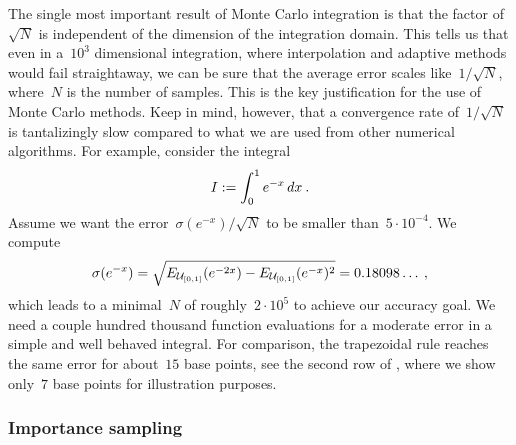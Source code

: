 The single most important result of Monte Carlo integration is that the factor
of~$\sqrt{N}$ is independent of the dimension of the integration domain. This
tells us that even in a~$10^3$ dimensional integration, where interpolation and
adaptive methods would fail straightaway, we can be sure that the average error
scales like~$1/\sqrt{N}$, where~$N$ is the number of samples. This is the key
justification for the use of Monte Carlo methods. Keep in mind, however, that a
convergence rate of~$1/\sqrt{N}$ is tantalizingly slow compared to what we are
used from other numerical algorithms. For example, consider the integral
%
\begin{equation}
  I := \int_0^1 e^{-x} \,dx\:.
\end{equation}
%
Assume we want the error~$\sigma (e^{-x}) / \sqrt{N}$ to be smaller
than~$5 \cdot 10^{-4}$. We compute
%
\begin{equation}\label{sigmaexp}
  \sigma (e^{-x}) =
    \sqrt{E_{\mathcal{U}_{[0,1]}}(e^{-2 x}) - E_{\mathcal{U}_{[0,1]}}(e^{-x})^2} =
    0.18098\ldots \:,
\end{equation}
%
which leads to a minimal~$N$ of roughly~$2\cdot10^5$ to achieve our accuracy
goal. We need a couple hundred thousand function evaluations for a moderate
error in a simple and well behaved integral. For comparison, the
trapezoidal rule reaches the same error for about~$15$ base points, see the
second row of , where we show only~$7$ base points for
illustration purposes.

\subsubsection{Importance sampling}

